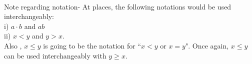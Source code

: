 \hrulefill\\
Note regarding notation- At places, the following notations would be used interchangeably:\\
i) $a\cdot b$ and $ab$\\
ii) $x<y$ and $y>x$.\\
Also
, $x\le y$ is going to be the notation for ``$x<y$ or $x=y$". Once again, $x \le y$ can be used interchangeably with $y \ge x$.

\hrulefill


\hrulefill